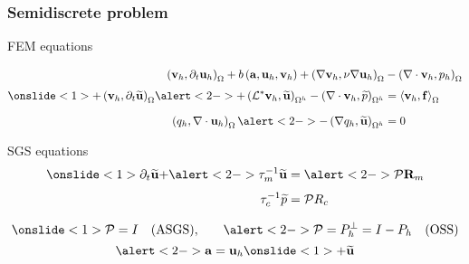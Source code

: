 \begin{frame}[t]
\frametitle{Semidiscrete problem}
\begin{block}{FEM equations}
\begin{overlayarea}{\textwidth}{2.0cm}
\vspace{-0.8cm}
\begin{align*}
\left( \mathbf{v}_{h},\partial _{t}\mathbf{u}_{h}\right) _{\Omega }
+ b\left(\mathbf{a},\mathbf{u}_h, \mathbf{v}_h\right)
+\left( \mathbf{\nabla v}_{h},\nu \mathbf{\nabla u}_{h}\right) _{\Omega} &
-\left( \mathbf{\nabla }\cdot \mathbf{v}_{h},p_{h}\right) _{\Omega }
\\[0.05in]
\onslide<1>{+\left( \mathbf{v}_{h},\partial _{t}\widetilde{\mathbf{u}}\right) _{\Omega}}
\alert<2->{+\left( \mathcal{L}^{\ast }\mathbf{v}_{h},\widetilde{\mathbf{u}}\right)_{\Omega^h}
-\left( \mathbf{\nabla }\cdot \mathbf{v}_{h},\widetilde{p}\right) _{\Omega^h}} &
=\left\langle \mathbf{v}_{h},\mathbf{f}\right\rangle_{\Omega }
\\[0.1in]
\left( q_{h},\mathbf{\nabla }\cdot \mathbf{u}_{h}\right) _{\Omega }
\alert<2->{-\left( \mathbf{\nabla }q_{h},\widetilde{\mathbf{u}}\right) _{\Omega^h}} & =0
\end{align*}
\end{overlayarea}
\end{block}
\begin{block}{SGS equations}
\vspace{-0.4cm}
\begin{align*}
\onslide<1>{\partial_{t}\widetilde{\mathbf{u}} +} \alert<2->{\tau_{m}^{-1} \widetilde{\mathbf{u}}}
&= \alert<2->{\mathcal{P} \mathbf{R}_{m}}
\\[0.05in]
\tau _{c}^{-1} \widetilde{p} & = \mathcal{P} R_{c}
\end{align*}
\end{block}
\vspace{-0.2cm}
\begin{overlayarea}{\textwidth}{3.0cm}
\begin{equation*}
\onslide<1>{\mathcal{P} = I \quad \rm{(ASGS)},} \quad \quad \alert<2->{\mathcal{P} = P_h^{\perp}=I-P_h \quad \rm{(OSS)}}
\end{equation*}
\vspace{-0.2cm}
\begin{equation*}
\alert<2->{\mathbf{a=u}_{h}}\onslide<1>{+\widetilde{\mathbf{u}}}
\end{equation*}
\end{overlayarea}
\end{frame}
